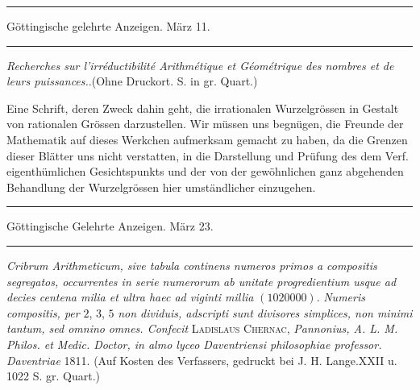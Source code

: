 \clearpage
{}
\thispagestyle{empty}
\begin{center}
\vspace*{1in}{\Large ANZEIGEN\par}
\vspace{.4in}{\large NICHT EIGNER\par}
\vspace{.4in}{\Large SCHRIFTEN.\par}
\end{center}

\clearpage
{}
\renewcommand{\BookRunningTitle}{Anzeigen nicht eigner Schriften}
\begin{center}
\rule{.86\linewidth}{.3pt}\par
Göttingische gelehrte Anzeigen. März 11.\par
\rule{.86\linewidth}{.3pt}
\end{center}
\begin{center}
\emph{Recherches sur l'irréductibilité Arithmétique et Géométrique des nombres et de leurs puissances.}.\quad (Ohne Druckort. S. in gr. Quart.)
\end{center}

Eine Schrift, deren Zweck dahin geht, die irrationalen Wurzelgrössen in Gestalt von rationalen Grössen darzustellen. Wir müssen uns begnügen, die Freunde der Mathematik auf dieses Werkchen aufmerksam gemacht zu haben, da die Grenzen dieser Blätter uns nicht verstatten, in die Darstellung und Prüfung des dem Verf. eigenthümlichen Gesichtspunkts und der von der gewöhnlichen ganz abgehenden Behandlung der Wurzelgrössen hier umständlicher einzugehen.

\begin{center}
\rule{.86\linewidth}{.3pt}\par
Göttingische Gelehrte Anzeigen. März 23.\par
\rule{.86\linewidth}{.3pt}
\end{center}
\emph{Cribrum Arithmeticum, sive tabula continens numeros primos a compositis segregatos, occurrentes in serie numerorum ab unitate progredientium usque ad decies centena milia et ultra haec ad viginti millia} $(1020000)$. \emph{Numeris compositis, per} $2$, $3$, $5$ \emph{non dividuis, adscripti sunt divisores simplices, non minimi tantum, sed omnino}
\emph{omnes. Confecit} \textsc{Ladislaus Chernac}, \emph{Pannonius, A. L. M. Philos. et Medic. Doctor, in almo lyceo Daventriensi philosophiae professor. Daventriae} 1811. (Auf Kosten des Verfassers, gedruckt bei J. H. Lange.\quad XXII u. 1022 S. gr. Quart.)


